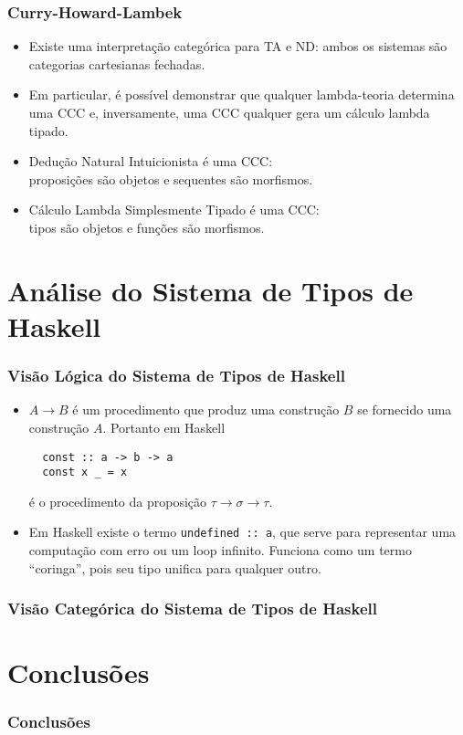 \documentclass{beamer}
\begin{document}
  \begin{frame}
    \frametitle{Curry-Howard-Lambek}
    \begin{itemize}
      \item Existe uma interpreta\c{c}\~ao categ\'orica para TA e ND: ambos os sistemas
        s\~ao categorias cartesianas fechadas.
        \pause
      \item Em particular, \'e poss\'ivel demonstrar que qualquer lambda-teoria determina uma CCC e, inversamente,
        uma CCC qualquer gera um c\'alculo lambda tipado.
        \pause
      \item Dedu\c{c}\~ao Natural Intuicionista \'e uma CCC:\\
        proposi\c{c}\~oes s\~ao objetos e sequentes s\~ao morfismos.
        \pause
      \item C\'alculo Lambda Simplesmente Tipado \'e uma CCC:\\
        tipos s\~ao objetos e fun\c{c}\~oes s\~ao morfismos.
    \end{itemize}
  \end{frame}


  \section{An\'alise do Sistema de Tipos de Haskell}
  \begin{frame}[fragile]
    \frametitle{Vis\~ao L\'ogica do Sistema de Tipos de Haskell}
    \begin{itemize}
      \item $A \rightarrow B$ \'e um procedimento que produz uma constru\c{c}\~ao $B$ se fornecido uma constru\c{c}\~ao
        $A$. Portanto em Haskell
\begin{verbatim}
  const :: a -> b -> a
  const x _ = x
\end{verbatim}
\'e o procedimento da proposi\c{c}\~ao $\tau \rightarrow \sigma \rightarrow \tau$.
      \item Em Haskell existe o termo \texttt{undefined :: a}, que serve
        para representar uma computa\c{c}\~ao com erro ou um loop infinito. Funciona como um termo
        ``coringa'', pois seu tipo unifica para qualquer outro.
    \end{itemize}
\end{frame}

  \begin{frame}
    \frametitle{Vis\~ao Categ\'orica do Sistema de Tipos de Haskell}
  \end{frame}

  \section{Conclus\~oes}
  \begin{frame}
    \frametitle{Conclus\~oes}
  \end{frame}
\end{document}
